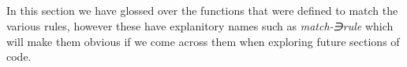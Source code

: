 {\begin{code}
\AgdaSymbol{(}\AgdaSpace{}%
\AgdaSymbol{)}\<%
\\
%
\>[25]\AgdaSpace{}%
\AgdaSpace{}%
\AgdaSpace{}%
\AgdaSpace{}%
\AgdaSymbol{(}\AgdaSpace{}%
\AgdaSymbol{)}\<%
\\
%
\>[25]\AgdaSpace{}%
\AgdaSymbol{(}\AgdaSpace{}%
\AgdaOperator{\AgdaInductiveConstructor{,}}\AgdaSpace{}%
\AgdaSymbol{)}\<%
\\
\>[.][@{}l@{}]\<[1938I]%
\>[23]\<%
\\
\>[23][@{}l@{\AgdaIndent{0}}]%
\>[25]\AgdaSpace{}%
\<%
\end{code}
}
In this section we have glossed over the functions that were defined to match the
various rules, however these have explanitory names such as \emph{match-∋rule} which
will make them obvious if we come across them when exploring future sections of
code.

